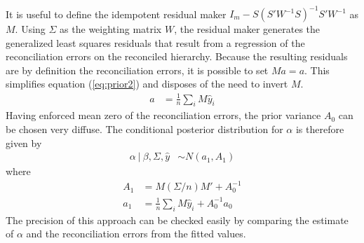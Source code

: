 \documentclass[a4paper,fleqn,11pt]{article}
\begin{document}
\begin{enumerate}
\begin{align}
\end{align}
It is useful to define the idempotent residual maker $I_m - S(S'W^{-1}S)^{-1}S'W^{-1}$ as $M$. Using $\Sigma$ as the weighting matrix $W$, the residual maker generates the generalized least squares residuals that result from a regression of the reconciliation errors on the reconciled hierarchy. Because the resulting residuals are by definition the reconciliation errors, it is possible to set $Ma = a$. This simplifies equation (\ref{eq:prior2}) and disposes of the need to invert $M$.
\begin{align}
	a &= \frac{1}{n}\sum_i M\hat{y}_i 
\end{align}
Having enforced mean zero of the reconciliation errors, the prior variance $A_0$ can be chosen very diffuse. The conditional posterior distribution for $\alpha$ is therefore given by
\begin{align}
	\label{eq:alpha}
	\alpha\ |\ \beta,\Sigma,\hat{y} &\sim N(a_1,A_1)
\end{align}
where
\begin{align*}
	A_1 &= M (\Sigma/n) M' + A_0^{-1} \\
	a_1 &= \frac{1}{n}\sum_i M\hat{y}_i  + A_0^{-1}a_0
\end{align*}
The precision of this approach can be checked easily by comparing the estimate of $\alpha$ and the reconciliation errors from the fitted values. \\


\end{enumerate}
\end{document}
